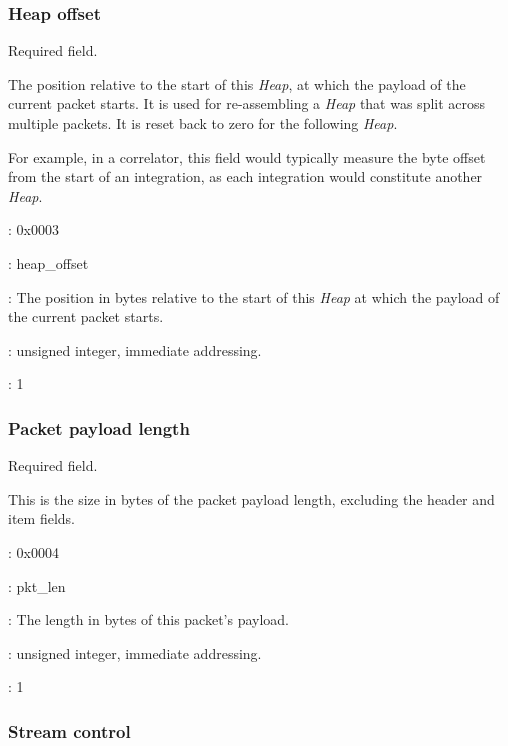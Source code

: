 \documentclass[11pt,english,twoside]{article}
\begin{document}
\subsubsection{Heap offset}

Required field.

The position relative to the start of this \emph{Heap}, at which the payload of the current packet starts. It is used for re-assembling a
\emph{Heap} that was split across multiple packets. It is reset back to zero for the following \emph{Heap}.

For example, in a correlator, this field would typically measure the byte offset from the start of an integration, as each integration would
constitute another \emph{Heap}.

\begin{description}
\setlength{\itemindent}{0.5cm}
\setlength{\itemsep}{0ex plus0.2ex}
\item[Numerical Identifier]: 0x0003
\item[Name]: heap\_offset
\item[Description]: The position in bytes relative to the start of this \emph{Heap} at which the payload of the current packet starts.
\item[Type]: unsigned integer, immediate addressing.
\item[Shape]: 1
\end{description}


\subsubsection{Packet payload length}

Required field.

This is the size in bytes of the packet payload length, excluding the header and item fields.

\begin{description}
\setlength{\itemindent}{0.5cm}
\setlength{\itemsep}{0ex plus0.2ex}
\item[Numerical Identifier]: 0x0004
\item[Name]: pkt\_len
\item[Description]: The length in bytes of this packet's payload.
\item[Type]: unsigned integer, immediate addressing.
\item[Shape]: 1
\end{description}


\subsubsection{Stream control}
\end{document}
